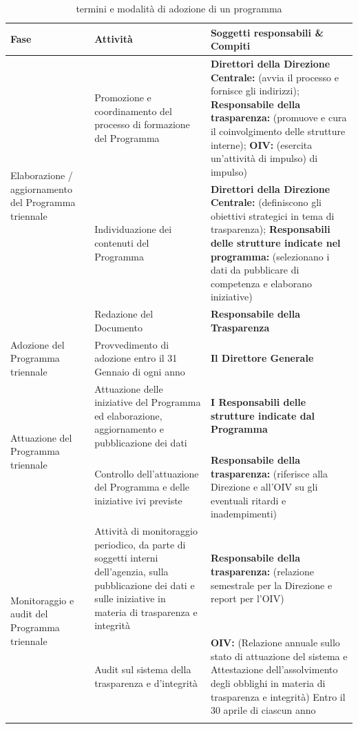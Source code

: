 \begin{longtable}{p{}|p{}|p{}}
\textbf{Fase} & \textbf{Attività} & \textbf{Soggetti responsabili \& Compiti} \\
\midrule

\endhead



\multirow{3}{0.2\textwidth}{ \vfill Elaborazione / aggiornamento del
Programma triennale} 
	& Promozione e coordinamento del processo di formazione del Programma 
	& \textbf{{\color{Plum}Direttori della Direzione Centrale}:} (avvia il processo e fornisce gli indirizzi);
	\newline
	\textbf{{\color{Plum} Responsabile della trasparenza}:} (promuove e cura il coinvolgimento delle strutture interne);
	\newline
	\textbf{{\color{Plum}OIV\ped{g}}:}
 (esercita un'attività di impulso)
di impulso) \\ \cline{2-3}
 & Individuazione dei contenuti del Programma 
 & \textbf{{\color{Plum}Direttori della Direzione Centrale}:} (definiscono gli obiettivi strategici in tema di trasparenza); \newline 
   \textbf{{\color{Plum} Responsabili delle strutture indicate nel programma}:} (selezionano i dati da pubblicare di competenza e elaborano iniziative)\\ \cline{2-3}
 & Redazione del Documento & \textbf{{\color{Plum}Responsabile della Trasparenza}}\\
\midrule
\vfill Adozione del Programma triennale & Provvedimento di adozione entro il 31 Gennaio di ogni anno & \textbf{{\color{Plum} Il Direttore Generale}} \\
\midrule

\multirow{2}{0.2\textwidth}{ \vfill Attuazione del Programma triennale} & Attuazione delle iniziative del Programma ed elaborazione, aggiornamento e pubblicazione dei dati & \textbf{{\color{Plum}I Responsabili delle strutture indicate dal Programma}} \\ \cline{2-3}
 & Controllo dell'attuazione del Programma e delle iniziative ivi previste & \textbf{{\color{Plum}Responsabile della trasparenza}:} (riferisce alla Direzione e all'OIV su gli eventuali ritardi e inadempimenti) \\ 

\midrule

\multirow{2}{0.2\textwidth}{\vfill Monitoraggio e audit del Programma triennale} 
& Attività di monitoraggio periodico, da parte di soggetti interni dell'agenzia, sulla pubblicazione dei dati e sulle iniziative in materia di trasparenza e integrità
& \textbf{{\color{Plum}Responsabile della trasparenza}:} (relazione semestrale per la Direzione e report per l'OIV) \\ \cline{2-3}
 & Audit sul sistema della trasparenza e d'integrità 
  & \textbf{{\color{Plum}OIV}:} (Relazione annuale sullo stato di attuazione del sistema e Attestazione dell'assolvimento degli obblighi in materia di trasparenza e integrità)
Entro il 30 aprile di ciascun anno \\
\bottomrule
\caption{termini e modalità di adozione di un programma}
\end{longtable}

